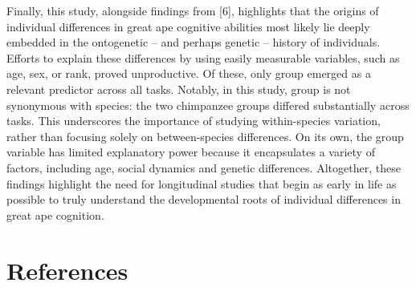 \documentclass[
  man,floatsintext]{apa6}
\begin{document}
Finally, this study, alongside findings from {[}6{]}, highlights that the origins of individual differences in great ape cognitive abilities most likely lie deeply embedded in the ontogenetic -- and perhaps genetic -- history of individuals. Efforts to explain these differences by using easily measurable variables, such as age, sex, or rank, proved unproductive. Of these, only group emerged as a relevant predictor across all tasks. Notably, in this study, group is not synonymous with species: the two chimpanzee groups differed substantially across tasks. This underscores the importance of studying within-species variation, rather than focusing solely on between-species differences. On its own, the group variable has limited explanatory power because it encapsulates a variety of factors, including age, social dynamics and genetic differences. Altogether, these findings highlight the need for longitudinal studies that begin as early in life as possible to truly understand the developmental roots of individual differences in great ape cognition.

\newpage

\section{References}\label{references}
\end{document}
